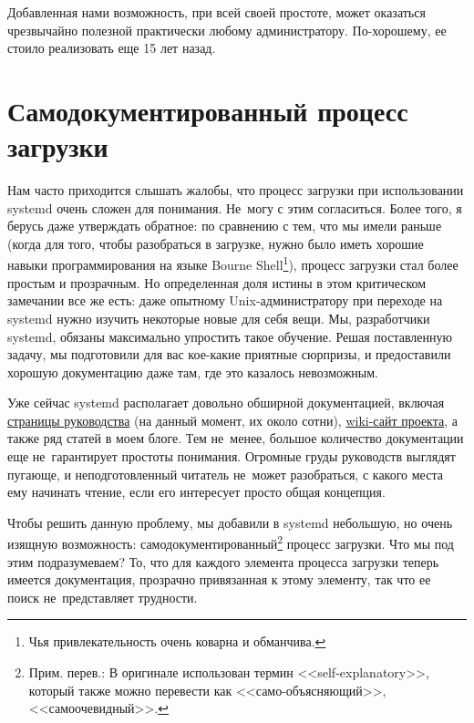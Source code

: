 \documentclass[10pt,oneside,a4paper]{article}
\begin{document}
Добавленная нами возможность, при всей своей простоте, может оказаться
чрезвычайно полезной практически любому администратору. По-хорошему, ее стоило
реализовать еще 15 лет назад.

\section{Самодокументированный процесс загрузки}

Нам часто приходится слышать жалобы, что процесс загрузки при использовании
systemd очень сложен для понимания. Не~могу с этим согласиться.  Более того, я
берусь даже утверждать обратное: по сравнению с тем, что мы имели раньше (когда
для того, чтобы разобраться в загрузке, нужно было иметь хорошие навыки
программирования на языке Bourne Shell\footnote{Чья привлекательность очень
коварна и обманчива.}), процесс загрузки стал более простым и прозрачным. Но
определенная доля истины в этом критическом замечании все же есть: даже опытному
Unix-администратору при переходе на systemd нужно изучить некоторые новые для
себя вещи. Мы, разработчики systemd, обязаны максимально упростить такое
обучение. Решая поставленную задачу, мы подготовили для вас кое-какие приятные
сюрпризы, и предоставили хорошую документацию даже там, где это казалось
невозможным.

Уже сейчас systemd располагает довольно обширной документацией, включая
\href{http://www.freedesktop.org/software/systemd/man/}{страницы руководства}
(на данный момент, их около сотни),
\href{http://www.freedesktop.org/wiki/Software/systemd}{wiki-сайт проекта}, а
также ряд статей в моем блоге. Тем не~менее, большое количество документации еще
не~гарантирует простоты понимания. Огромные груды руководств выглядят пугающе, и
неподготовленный читатель не~может разобраться, с какого места ему начинать
чтение, если его интересует просто общая концепция.

Чтобы решить данную проблему, мы добавили в systemd небольшую, но очень изящную
возможность: самодокументированный\footnote{Прим. перев.: В оригинале
использован термин <<self-explanatory>>, который также можно перевести как
<<само-объясняющий>>, <<самоочевидный>>.} процесс загрузки. Что мы под этим
подразумеваем? То, что для каждого элемента процесса загрузки теперь имеется
документация, прозрачно привязанная к этому элементу, так что ее поиск
не~представляет трудности.
\end{document}

